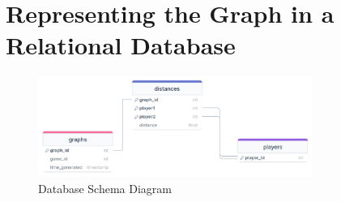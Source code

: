 \documentclass[a4paper,11pt]{article}
\begin{document}
\newpage
\tableofcontents
\newpage
\setcounter{page}{1}

\section{Representing the Graph in a Relational Database}
\begin{figure}[H]
    \centering
    \includegraphics[width=0.8\textwidth]{./images/schema.png}
    \caption{Database Schema Diagram}
\end{figure}
\end{document}
